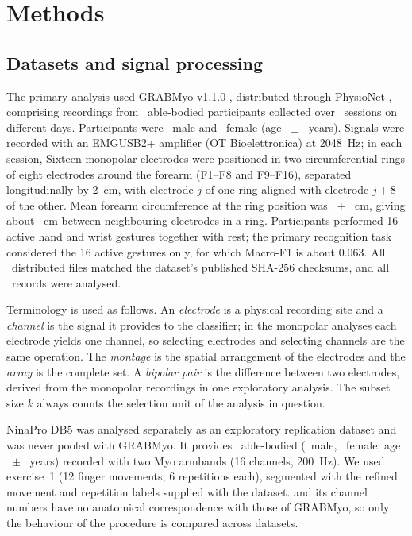 \section{Methods}
\label{sec:methods}

\subsection[Datasets and signal processing]{Datasets and signal processing}
\label{sec:datasets}

The primary analysis used GRABMyo v1.1.0 \citep{pradhan2022multiday,jiang2024grabmyo}, distributed through PhysioNet \citep{goldberger2000physionet}, comprising recordings from \GRABMyoParticipants\ able-bodied participants collected over \GRABMyoSessions\ sessions on different days. Participants were \GRABMyoMale\ male and \GRABMyoFemale\ female (age \GRABMyoAgeMean\ $\pm$ \GRABMyoAgeSD\ years). Signals were recorded with an EMGUSB2+ amplifier (OT Bioelettronica) at 2048~Hz; in each session,  Sixteen monopolar electrodes were positioned in two circumferential rings of eight electrodes around the forearm (F1--F8 and F9--F16), separated longitudinally by 2~cm, with electrode $j$ of one ring aligned with electrode $j+8$ of the other. Mean forearm circumference at the ring position was \GRABMyoCircMean\ $\pm$ \GRABMyoCircSD~cm, giving about \GRABMyoArcSpacing~cm between neighbouring electrodes in a ring. Participants performed 16 active hand and wrist gestures together with rest; the primary recognition task considered the 16 active gestures only, for which  Macro-F1 is about 0.063. All \GRABMyoFilesVerified\ distributed files matched the dataset's published SHA-256 checksums, and all \GRABMyoRecords\ records were analysed.

Terminology is used as follows. An \emph{electrode} is a physical recording site and a \emph{channel} is the signal it provides to the classifier; in the monopolar analyses each electrode yields one channel, so selecting electrodes and selecting channels are the same operation. The \emph{montage} is the spatial arrangement of the electrodes and the \emph{array} is the complete set. A \emph{bipolar pair} is the difference between two electrodes, derived from the monopolar recordings in one exploratory analysis. The subset size $k$ always counts the selection unit of the analysis in question.

NinaPro DB5 \citep{pizzolato2017comparison} was analysed separately as an exploratory replication dataset and was never pooled with GRABMyo. It provides \DBFiveSubjects\ able-bodied  (\DBFiveMale\ male, \DBFiveFemale\ female; age \DBFiveAgeMean\ $\pm$ \DBFiveAgeSD\ years) recorded with two Myo armbands (16 channels, 200~Hz). We used exercise~1 (12 finger movements, 6 repetitions each), segmented with the refined movement and repetition labels supplied with the dataset.  and its channel numbers have no anatomical correspondence with those of GRABMyo, so only the behaviour of the procedure is compared across datasets.

